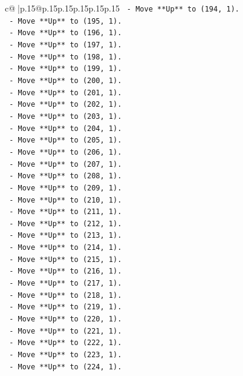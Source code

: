 \documentclass{article}
\begin{document}
{\begin{supertabular}{c@{$\;$}|p{.15\linewidth}@{}p{.15\linewidth}p{.15\linewidth}p{.15\linewidth}p{.15\linewidth}p{.15\linewidth}}
{{{\texttt{    {-} Move **Up** to (194, 1).} \\
\texttt{    {-} Move **Up** to (195, 1).} \\
\texttt{    {-} Move **Up** to (196, 1).} \\
\texttt{    {-} Move **Up** to (197, 1).} \\
\texttt{    {-} Move **Up** to (198, 1).} \\
\texttt{    {-} Move **Up** to (199, 1).} \\
\texttt{    {-} Move **Up** to (200, 1).} \\
\texttt{    {-} Move **Up** to (201, 1).} \\
\texttt{    {-} Move **Up** to (202, 1).} \\
\texttt{    {-} Move **Up** to (203, 1).} \\
\texttt{    {-} Move **Up** to (204, 1).} \\
\texttt{    {-} Move **Up** to (205, 1).} \\
\texttt{    {-} Move **Up** to (206, 1).} \\
\texttt{    {-} Move **Up** to (207, 1).} \\
\texttt{    {-} Move **Up** to (208, 1).} \\
\texttt{    {-} Move **Up** to (209, 1).} \\
\texttt{    {-} Move **Up** to (210, 1).} \\
\texttt{    {-} Move **Up** to (211, 1).} \\
\texttt{    {-} Move **Up** to (212, 1).} \\
\texttt{    {-} Move **Up** to (213, 1).} \\
\texttt{    {-} Move **Up** to (214, 1).} \\
\texttt{    {-} Move **Up** to (215, 1).} \\
\texttt{    {-} Move **Up** to (216, 1).} \\
\texttt{    {-} Move **Up** to (217, 1).} \\
\texttt{    {-} Move **Up** to (218, 1).} \\
\texttt{    {-} Move **Up** to (219, 1).} \\
\texttt{    {-} Move **Up** to (220, 1).} \\
\texttt{    {-} Move **Up** to (221, 1).} \\
\texttt{    {-} Move **Up** to (222, 1).} \\
\texttt{    {-} Move **Up** to (223, 1).} \\
\texttt{    {-} Move **Up** to (224, 1).} \\
}}}
\end{supertabular}}
\end{document}
